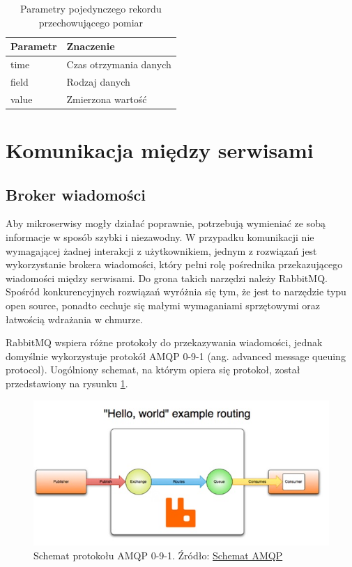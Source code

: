 \documentclass[11pt, a4]{article} %
\begin{document}
\begin{table}[!ht]
    \caption{Parametry pojedynczego rekordu przechowującego pomiar}
    \label{tab:parametry-pomiaru}
    \begin{tabularx}{1\textwidth} { 
        | >{\raggedright\arraybackslash}X 
        | >{\raggedleft\arraybackslash}X | }
        \hline
       Parametr & Znaczenie \\
       \hline
       time & Czas otrzymania danych \\
       \hline
       field & Rodzaj danych \\
       \hline
       value & Zmierzona wartość \\
       \hline
    \end{tabularx}
\end{table}


\section{Komunikacja między serwisami}
\subsection{Broker wiadomości}

Aby mikroserwisy mogły działać poprawnie, potrzebują wymieniać ze sobą informacje 
w sposób szybki i niezawodny. W przypadku komunikacji nie wymagającej żadnej interakcji 
z użytkownikiem, jednym z rozwiązań jest wykorzystanie brokera wiadomości, który pełni 
rolę pośrednika przekazującego wiadomości między serwisami. Do grona takich narzędzi 
należy RabbitMQ. Spośród konkurencyjnych rozwiązań wyróżnia się tym, że jest to 
narzędzie typu open source, ponadto cechuje się małymi wymaganiami sprzętowymi oraz 
łatwością wdrażania w chmurze. 

RabbitMQ wspiera różne protokoły do przekazywania wiadomości, jednak domyślnie 
wykorzystuje protokół AMQP 0-9-1 (ang. advanced message queuing protocol). Uogólniony 
schemat, na którym opiera się protokoł, został przedstawiony na rysunku \ref{fig:schemat-amqp}.

\begin{figure}[h]
    \centering
    \includegraphics[width=1\textwidth]{amqp_schema.jpg}
    \caption{Schemat protokołu AMQP 0-9-1. Źródło: \href{https://www.rabbitmq.com/tutorials/amqp-concepts.html}{Schemat AMQP}}
    \label{fig:schemat-amqp}
\end{figure}
\end{document}
